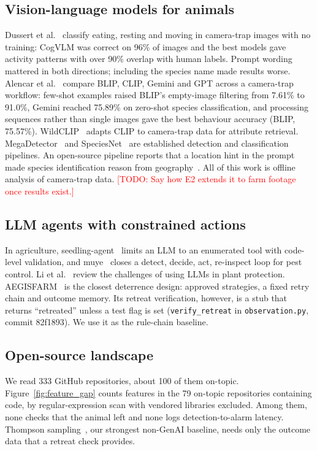 \documentclass[conference]{IEEEtran}
\newcommand{\todo}[1]{\textcolor{red}{[TODO: #1]}}
\begin{document}
\subsection{Vision-language models for animals}
Dussert et al.~\cite{dussert2025zeroshot} classify eating, resting and moving in camera-trap images with no
training: CogVLM was correct on 96\% of images and the best models gave activity patterns with over
90\% overlap with human labels. Prompt wording mattered in both directions; including the species name
made results worse. Alencar et al.~\cite{alencar2026advancing} compare BLIP, CLIP, Gemini and GPT across a camera-trap
workflow: few-shot examples raised BLIP's empty-image filtering from 7.61\% to 91.0\%, Gemini reached
75.89\% on zero-shot species classification, and processing sequences rather than single images gave the
best behaviour accuracy (BLIP, 75.57\%). WildCLIP~\cite{gabeff2024wildclip} adapts CLIP to camera-trap data for
attribute retrieval. MegaDetector~\cite{beery2019megadetector} and SpeciesNet~\cite{gadot2024crop} are
established detection and classification pipelines. An open-source pipeline reports that a location hint in the
prompt made species identification reason from geography~\cite{repo_alexkapy}. All of this
work is offline analysis of camera-trap data. \todo{Say how E2 extends it to farm footage once results exist.}

\subsection{LLM agents with constrained actions}
In agriculture, seedling-agent~\cite{repo_seedling} limits an LLM to an enumerated tool
with code-level validation, and muye~\cite{repo_muye} closes a detect, decide, act, re-inspect loop for pest control.
Li et al.~\cite{li2026plantllm} review the challenges of using LLMs in plant protection.
AEGISFARM~\cite{repo_aegisfarm} is the closest deterrence design: approved strategies, a fixed retry chain and
outcome memory. Its retreat verification, however, is a stub that returns ``retreated'' unless a test
flag is set (\texttt{verify\_retreat} in \texttt{observation.py}, commit 82f1893). We use it as the rule-chain baseline.

\subsection{Open-source landscape}
We read 333 GitHub repositories, about 100 of them on-topic. Figure~\ref{fig:feature_gap} counts features
in the 79 on-topic repositories containing code, by regular-expression scan with vendored libraries
excluded. Among them, none checks that the animal left and none logs detection-to-alarm
latency. Thompson sampling~\cite{thompson1933}, our strongest non-GenAI baseline, needs only the
outcome data that a retreat check provides.
\end{document}
